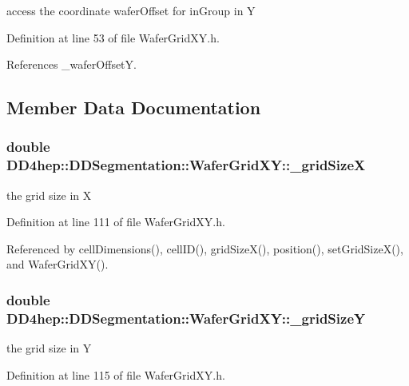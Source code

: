 access the coordinate waferOffset for inGroup in Y 

Definition at line 53 of file WaferGridXY.h.

References \_\-waferOffsetY.

\subsection{Member Data Documentation}
\hypertarget{class_d_d4hep_1_1_d_d_segmentation_1_1_wafer_grid_x_y_af1d00f186fda3aca2aed961911bc3c04}{
\subsubsection[{\_\-gridSizeX}]{\setlength{\rightskip}{0pt plus 5cm}double {\bf DD4hep::DDSegmentation::WaferGridXY::\_\-gridSizeX}}}
\label{class_d_d4hep_1_1_d_d_segmentation_1_1_wafer_grid_x_y_af1d00f186fda3aca2aed961911bc3c04}


the grid size in X 

Definition at line 111 of file WaferGridXY.h.

Referenced by cellDimensions(), cellID(), gridSizeX(), position(), setGridSizeX(), and WaferGridXY().\hypertarget{class_d_d4hep_1_1_d_d_segmentation_1_1_wafer_grid_x_y_ae68069d981e55954dc25e9fbc8cc2e11}{
\subsubsection[{\_\-gridSizeY}]{\setlength{\rightskip}{0pt plus 5cm}double {\bf DD4hep::DDSegmentation::WaferGridXY::\_\-gridSizeY}}}
\label{class_d_d4hep_1_1_d_d_segmentation_1_1_wafer_grid_x_y_ae68069d981e55954dc25e9fbc8cc2e11}


the grid size in Y 

Definition at line 115 of file WaferGridXY.h.

